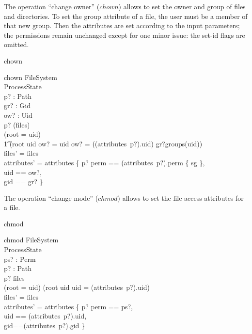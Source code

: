 The operation ``change owner'' ($chown$) allows to set the owner and group of
files and directories.  To set the group attribute of a file, the user must be a
member of that new group.  Then the attributes are set according to the input
parameters; the permissions remain unchanged except for one minor issue: the
set-id flags are omitted.
\begin{doc}{chown}
  \begin{schema}{chown}
    \Delta FileSystem \\
    \Xi ProcessState \\
    p? : Path \\
    gr? : Gid \\
    ow? : Uid \\
    \where
    p? \in \dom(files) \\

    (root = uid) \lor \\
    \t1 (root \neq uid \land ow? = uid \land ow? = ((attributes~p?).uid) \land
    gr?\in groups(uid)) \\ 

    files' = files \\
    attributes' = attributes \oplus \{ p? \mapsto \lblot \< perm ==
    (attributes~p?).perm \setminus\{ sg \}, \\
    uid == ow?, \\
    gid == gr? \rblot \} \> \\
  \end{schema}
\end{doc}

The operation ``change mode'' ($chmod$) allows to set the file access attributes
for a file.
\begin{doc}{chmod}
  \begin{schema}{chmod}
    \Delta FileSystem   \\
    \Xi ProcessState \\
    ps? : \power Perm \\
    p? : Path \\
    \where  %
    p? \in \dom files \\

    (root = uid) \lor (root \neq uid \land uid = (attributes~p?).uid) \\
    
    files' = files \\
    attributes' = attributes \oplus \{ p? \mapsto \lblot \< perm == ps?, \\
    uid == (attributes~p?).uid, \\ 
    gid==(attributes~p?).gid \rblot \} \> \\
  \end{schema}
\end{doc}

